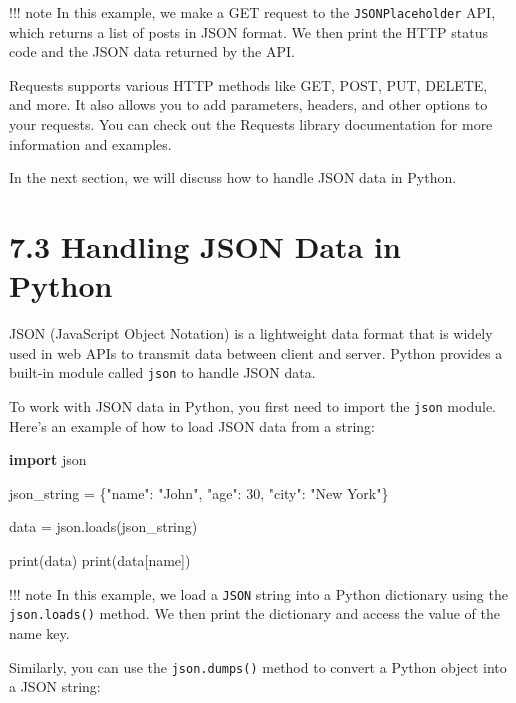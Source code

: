 \documentclass[
  paper=a4,
  ,captions=tableheading
]{scrartcl}
\newenvironment{Shaded}{}{}
\newcommand{\BuiltInTok}[1]{\textcolor[rgb]{0.00,0.50,0.00}{#1}}
\newcommand{\ImportTok}[1]{\textcolor[rgb]{0.00,0.50,0.00}{\textbf{#1}}}
\newcommand{\NormalTok}[1]{#1}
\newcommand{\OperatorTok}[1]{\textcolor[rgb]{0.40,0.40,0.40}{#1}}
\newcommand{\StringTok}[1]{\textcolor[rgb]{0.25,0.44,0.63}{#1}}
\begin{document}
!!! note In this example, we make a GET request to the
\texttt{JSONPlaceholder} API, which returns a list of posts in JSON
format. We then print the HTTP status code and the JSON data returned by
the API.

Requests supports various HTTP methods like GET, POST, PUT, DELETE, and
more. It also allows you to add parameters, headers, and other options
to your requests. You can check out the Requests library documentation
for more information and examples.

In the next section, we will discuss how to handle JSON data in Python.

\hypertarget{handling-json-data-in-python}{%
\section{7.3 Handling JSON Data in
Python}\label{handling-json-data-in-python}}

JSON (JavaScript Object Notation) is a lightweight data format that is
widely used in web APIs to transmit data between client and server.
Python provides a built-in module called \texttt{json} to handle JSON
data.

To work with JSON data in Python, you first need to import the
\texttt{json} module. Here's an example of how to load JSON data from a
string:

\begin{Shaded}
\begin{Highlighting}[]
\ImportTok{import}\NormalTok{ json}

\NormalTok{json\_string }\OperatorTok{=} \StringTok{\textquotesingle{}\{"name": "John", "age": 30, "city": "New York"\}\textquotesingle{}}

\NormalTok{data }\OperatorTok{=}\NormalTok{ json.loads(json\_string)}

\BuiltInTok{print}\NormalTok{(data)}
\BuiltInTok{print}\NormalTok{(data[}\StringTok{\textquotesingle{}name\textquotesingle{}}\NormalTok{])}
\end{Highlighting}
\end{Shaded}

!!! note In this example, we load a \texttt{JSON} string into a Python
dictionary using the \texttt{json.loads()} method. We then print the
dictionary and access the value of the name key.

Similarly, you can use the \texttt{json.dumps()} method to convert a
Python object into a JSON string:
\end{document}
